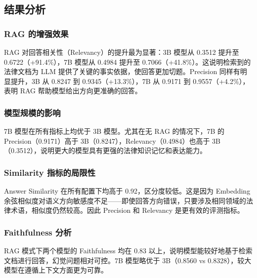 \documentclass[12pt, a4paper]{article}
\begin{document}
\subsection{结果分析}

\subsubsection{RAG 的增强效果}

RAG 对回答相关性（Relevancy）的提升最为显著：3B 模型从 0.3512 提升至 0.6722（+91.4\%），7B 模型从 0.4984 提升至 0.7066（+41.8\%）。这说明检索到的法律文档为 LLM 提供了关键的事实依据，使回答更加切题。Precision 同样有明显提升，3B 从 0.8247 到 0.9345（+13.3\%），7B 从 0.9171 到 0.9557（+4.2\%），表明 RAG 帮助模型给出方向更准确的回答。

\subsubsection{模型规模的影响}

7B 模型在所有指标上均优于 3B 模型。尤其在无 RAG 的情况下，7B 的 Precision（0.9171）高于 3B（0.8247），Relevancy（0.4984）也高于 3B（0.3512），说明更大的模型具有更强的法律知识记忆和表达能力。

\subsubsection{Similarity 指标的局限性}

Answer Similarity 在所有配置下均高于 0.92，区分度较低。这是因为 Embedding 余弦相似度对语义方向敏感度不足——即使回答方向错误，只要涉及相同领域的法律术语，相似度仍然较高。因此 Precision 和 Relevancy 是更有效的评测指标。

\subsubsection{Faithfulness 分析}

RAG 模式下两个模型的 Faithfulness 均在 0.83 以上，说明模型能较好地基于检索文档进行回答，幻觉问题相对可控。7B 模型略优于 3B（0.8560 vs 0.8328），较大模型在遵循上下文方面更为可靠。
\end{document}

